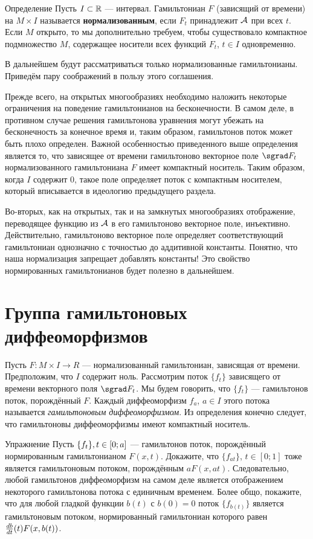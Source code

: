 \begin{thm}{Определение}
Пусть $I \subset \mathbb{R}$ --- интервал.
Гамильтониан $F$ (зависящий от времени) на $M \times I$ называется \textbf{нормализованным}, если $F_t$ принадлежит $\mathcal{A}$ при всех $t$.
Если $M$ открыто, то мы дополнительно требуем, чтобы существовало компактное подмножество $M$, содержащее носители всех функций $F_t$, $t \in I$ одновременно.
\end{thm}

В дальнейшем будут рассматриваться только нормализованные гамильтонианы.
Приведём пару соображений в пользу этого соглашения.

Прежде всего, на открытых многообразиях необходимо наложить некоторые ограничения на поведение гамильтонианов на бесконечности.
В самом деле, в противном случае решения гамильтонова уравнения могут
убежать на бесконечность за конечное время и, таким образом, гамильтонов поток может быть плохо определен.
Важной особенностью приведенного выше определения является то, что зависящее от времени гамильтоново векторное поле $\sgrad F_t$ нормализованного гамильтониана $F$ имеет компактный носитель.
Таким образом, когда $I$ содержит $0$, такое поле определяет поток с компактным носителем, который вписывается в идеологию предыдущего раздела.

Во-вторых, как на открытых, так и на замкнутых многообразиях отображение, переводящее функцию из $\mathcal{A}$ в его гамильтоново векторное поле, инъективно.
Действительно, гамильтоново векторное поле определяет соответствующий гамильтониан однозначно с точностью до аддитивной константы.
Понятно, что наша нормализация запрещает добавлять константы!
Это свойство нормированных гамильтонианов будет полезно в дальнейшем.

\section{Группа гамильтоновых диф\-фе\-о\-мор\-физ\-мов}\label{1.4}

Пусть $F: M \times I \to R$ --- нормализованный гамильтониан, зависящая от времени.
Предположим, что $I$ содержит ноль.
Рассмотрим поток $\{f_t\}$ зависящего от времени векторного поля $\sgrad F_t$.
Мы будем говорить, что $\{f_t\}$ --- гамильтонов поток, порождённый $F$.
Каждый диффеоморфизм $f_a$, $a \in I$ этого потока называется \emph{гамильтоновым диффеоморфизмом}.
Из определения конечно следует, что гамильтоновы диффеоморфизмы имеют компактный носитель.

\begin{thm}{Упражнение}\label{1.4.A}
Пусть $\{f_t\}, t \z\in [0; a]$ --- гамильтонов поток, порождённый нормированным гамильтонианом $ F (x, t)$.
Докажите, что $\{f_{at}\}$, $t \in [0; 1]$ тоже является гамильтоновым потоком, порождённым $aF (x, at)$.
Следовательно, любой гамильтонов диффеоморфизм на самом деле является отображением некоторого гамильтонова потока с единичным временем.
Более общо, покажите, что для любой гладкой функции $b (t)$ с $b (0) =
0$ поток $\{f_{b (t)}\}$ является гамильтоновым потоком, нормированный
гамильтониан которого равен $\tfrac{d b}{d t} (t) F (x, b (t))$.
\end{thm}


